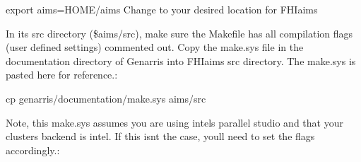 \documentclass[letterpaper,10pt,english]{sphinxmanual}
\begin{document}
\begin{sphinxVerbatim}[commandchars=\\\{\}]
export \PYGZdl{}aims=\PYGZdl{}\PYGZob{}HOME\PYGZcb{}/aims  \PYGZsh{}Change to your desired location for FHI\PYGZhy{}aims
\end{sphinxVerbatim}

In its src directory (\$aims/src), make sure the Makefile has all compilation
flags (user defined settings) commented out.
Copy the make.sys file in the documentation directory of Genarris into
FHI\sphinxhyphen{}aims\textquotesingle{} src directory. The make.sys is pasted here for reference.:

\begin{sphinxVerbatim}[commandchars=\\\{\}]
cp \PYGZdl{}genarris/documentation/make.sys \PYGZdl{}aims/src
\end{sphinxVerbatim}

Note, this make.sys assumes you are using intel\textquotesingle{}s parallel studio and that your
cluster\textquotesingle{}s backend is intel. If this isn\textquotesingle{}t the case, you\textquotesingle{}ll need to set the
flags accordingly.:
\end{document}
